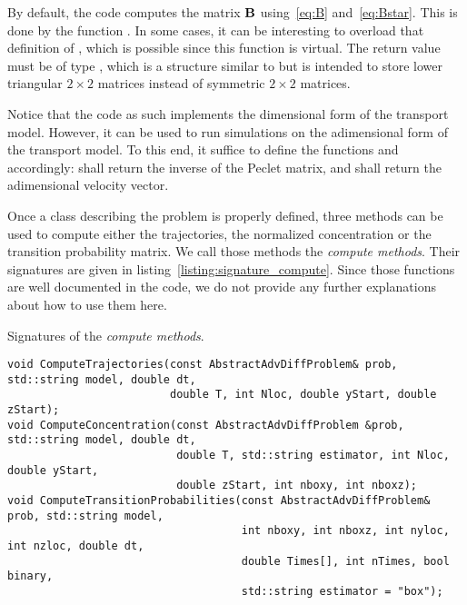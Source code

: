 By default, the code computes the matrix $\mathbf B$ using~\eqref{eq:B} and~\eqref{eq:Bstar}. This is done by the function . In some cases, it can be interesting to overload that definition of , which is possible since this function is virtual. The return value must be of type , which is a structure similar to  but is intended to store lower triangular $2\times2$ matrices instead of symmetric $2\times2$ matrices.

Notice that the code as such implements the dimensional form of the transport model. However, it can be used to run simulations on the adimensional form of the transport model. To this end, it suffice to define the functions  and  accordingly:  shall return the inverse of the Peclet matrix, and  shall return the adimensional velocity vector.

Once a class describing the problem is properly defined, three methods can be used to compute either the trajectories, the normalized concentration or the transition probability matrix. We call those methods the \textit{compute methods}. Their signatures are given in listing~\ref{listing:signature_compute}. Since those functions are well documented in the code, we do not provide any further explanations about how to use them here.
\begin{listing}[ht!]
\caption{Signatures of the \textit{compute methods}.}
\label{listing:signature_compute}
\begin{verbatim}
void ComputeTrajectories(const AbstractAdvDiffProblem& prob, std::string model, double dt,
						 double T, int Nloc, double yStart, double zStart);
void ComputeConcentration(const AbstractAdvDiffProblem &prob, std::string model, double dt,
						  double T, std::string estimator, int Nloc, double yStart,
						  double zStart, int nboxy, int nboxz);
void ComputeTransitionProbabilities(const AbstractAdvDiffProblem& prob, std::string model,
									int nboxy, int nboxz, int nyloc, int nzloc, double dt,
									double Times[], int nTimes, bool binary,
									std::string estimator = "box");
\end{verbatim}
\end{listing}

